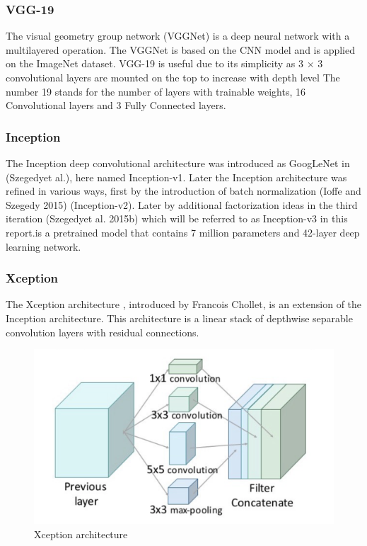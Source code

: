 \subsubsection{VGG-19}
The visual geometry group network (VGGNet) is a deep neural network with a multilayered
operation. The VGGNet is based on the CNN model and is applied on the ImageNet dataset. VGG-19
is useful due to its simplicity as 3 × 3 convolutional layers are mounted on the top to increase with
depth level \cite{art41}
The number 19 stands for the number
of layers with trainable weights, 16 Convolutional layers and 3 Fully Connected layers. 



\subsubsection{Inception}
The Inception deep convolutional architecture was introduced as GoogLeNet in
(Szegedyet al.)\cite{art31}, here named Inception-v1. Later the Inception architecture was
refined in various ways, first by the introduction of batch normalization (Ioffe and
Szegedy 2015) (Inception-v2). Later by additional factorization ideas in the third iteration
(Szegedyet al. 2015b) which will be referred to as Inception-v3 in this report.is a
pretrained model that contains 7 million parameters and 42-layer deep learning network.

\subsubsection{Xception}
The Xception architecture \cite{art42}, introduced by
Francois Chollet, is an extension of the Inception architecture. This architecture is a linear stack of depthwise
separable convolution layers with residual connections.
\begin{figure}[!h]
    \centering
    \includegraphics[width=1\textwidth]{chapters/chapter02/fig02/xception.png}
    \caption{ Xception architecture}
    \label{fig:my_label}
\end{figure}

